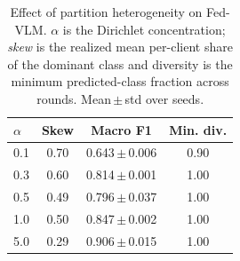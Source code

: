 \begin{table}[t]
\caption{Effect of partition heterogeneity on Fed-VLM. $\alpha$ is the
Dirichlet concentration; \emph{skew} is the realized mean per-client share of
the dominant class and diversity is the minimum predicted-class fraction
across rounds. Mean\,$\pm$\,std over seeds.}
\label{tab:alpha}
\centering\footnotesize
\setlength\tabcolsep{5pt}
\begin{tabular}{lccc}
\toprule
$\alpha$ & Skew & Macro F1 & Min. div.\\
\midrule
0.1 & 0.70 & 0.643\,$\pm$\,0.006 & 0.90 \\
0.3 & 0.60 & 0.814\,$\pm$\,0.001 & 1.00 \\
0.5 & 0.49 & 0.796\,$\pm$\,0.037 & 1.00 \\
1.0 & 0.50 & 0.847\,$\pm$\,0.002 & 1.00 \\
5.0 & 0.29 & 0.906\,$\pm$\,0.015 & 1.00 \\
\bottomrule
\end{tabular}
\end{table}
